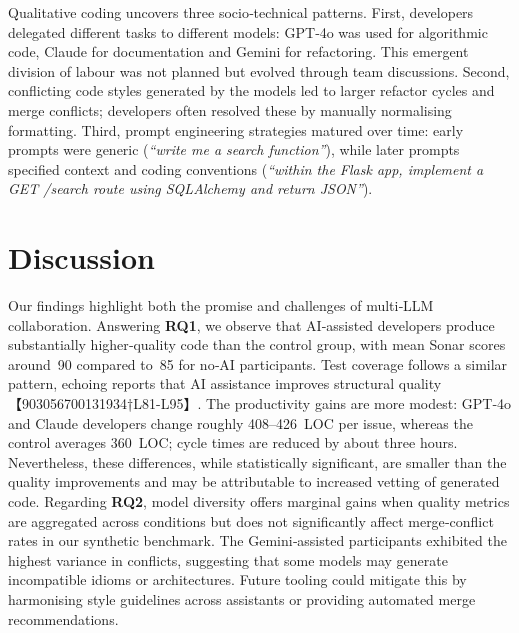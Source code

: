 \documentclass[conference]{IEEEtran}
\begin{document}
Qualitative coding uncovers three socio‑technical patterns.  First, developers delegated different tasks to different models: GPT‑4o was used for algorithmic code, Claude for documentation and Gemini for refactoring.  This emergent division of labour was not planned but evolved through team discussions.  Second, conflicting code styles generated by the models led to larger refactor cycles and merge conflicts; developers often resolved these by manually normalising formatting.  Third, prompt engineering strategies matured over time: early prompts were generic (\emph{“write me a search function”}), while later prompts specified context and coding conventions (\emph{“within the Flask app, implement a GET /search route using SQLAlchemy and return JSON”}).

\section{Discussion}
Our findings highlight both the promise and challenges of multi‑LLM collaboration.  Answering \textbf{RQ1}, we observe that AI‑assisted developers produce substantially higher‑quality code than the control group, with mean Sonar scores around 90 compared to 85 for no‑AI participants.  Test coverage follows a similar pattern, echoing reports that AI assistance improves structural quality 【903056700131934†L81-L95】.  The productivity gains are more modest: GPT‑4o and Claude developers change roughly 408–426 LOC per issue, whereas the control averages 360 LOC; cycle times are reduced by about three hours.  Nevertheless, these differences, while statistically significant, are smaller than the quality improvements and may be attributable to increased vetting of generated code.  Regarding \textbf{RQ2}, model diversity offers marginal gains when quality metrics are aggregated across conditions but does not significantly affect merge‑conflict rates in our synthetic benchmark.  The Gemini‑assisted participants exhibited the highest variance in conflicts, suggesting that some models may generate incompatible idioms or architectures.  Future tooling could mitigate this by harmonising style guidelines across assistants or providing automated merge recommendations.
\end{document}
